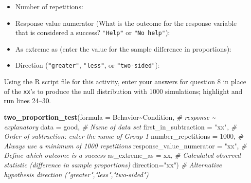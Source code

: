 \documentclass[
]{report}
\newenvironment{Shaded}{\begin{snugshade}}{\end{snugshade}}
\newcommand{\AttributeTok}[1]{\textcolor[rgb]{0.13,0.29,0.53}{#1}}
\newcommand{\CommentTok}[1]{\textcolor[rgb]{0.56,0.35,0.01}{\textit{#1}}}
\newcommand{\DecValTok}[1]{\textcolor[rgb]{0.00,0.00,0.81}{#1}}
\newcommand{\FunctionTok}[1]{\textcolor[rgb]{0.13,0.29,0.53}{\textbf{#1}}}
\newcommand{\NormalTok}[1]{#1}
\newcommand{\SpecialCharTok}[1]{\textcolor[rgb]{0.81,0.36,0.00}{\textbf{#1}}}
\newcommand{\StringTok}[1]{\textcolor[rgb]{0.31,0.60,0.02}{#1}}
\providecommand{\tightlist}{%
  \setlength{\itemsep}{0pt}\setlength{\parskip}{0pt}}
\begin{document}
\begin{itemize}
\tightlist
\item
  Number of repetitions:
\end{itemize}

\vspace{.15in}

\begin{itemize}
\tightlist
\item
  Response value numerator (What is the outcome for the response variable that is considered a success? \texttt{"Help"} or \texttt{"No\ help"}):
\end{itemize}

\vspace{.15in}

\begin{itemize}
\tightlist
\item
  As extreme as (enter the value for the sample difference in proportions):
\end{itemize}

\vspace{.15in}

\begin{itemize}
\tightlist
\item
  Direction (\texttt{"greater"}, \texttt{"less"}, or \texttt{"two-sided"}):
\end{itemize}

\vspace{.15in}

Using the R script file for this activity, enter your answers for question 8 in place of the \texttt{xx}'s to produce the null distribution with 1000 simulations; highlight and run lines 24--30.

\begin{Shaded}
\begin{Highlighting}[]
\FunctionTok{two\_proportion\_test}\NormalTok{(}\AttributeTok{formula =}\NormalTok{ Behavior}\SpecialCharTok{\textasciitilde{}}\NormalTok{Condition, }\CommentTok{\# response \textasciitilde{} explanatory}
    \AttributeTok{data =}\NormalTok{ good, }\CommentTok{\# Name of data set}
    \AttributeTok{first\_in\_subtraction =} \StringTok{"xx"}\NormalTok{, }\CommentTok{\# Order of subtraction: enter the name of Group 1}
    \AttributeTok{number\_repetitions =} \DecValTok{1000}\NormalTok{, }\CommentTok{\# Always use a minimum of 1000 repetitions}
    \AttributeTok{response\_value\_numerator =} \StringTok{"xx"}\NormalTok{, }\CommentTok{\# Define which outcome is a success}
    \AttributeTok{as\_extreme\_as =}\NormalTok{ xx, }\CommentTok{\# Calculated observed statistic (difference in sample proportions)}
    \AttributeTok{direction=}\StringTok{"xx"}\NormalTok{) }\CommentTok{\# Alternative hypothesis direction ("greater","less","two{-}sided")}
\end{Highlighting}
\end{Shaded}
\end{document}
